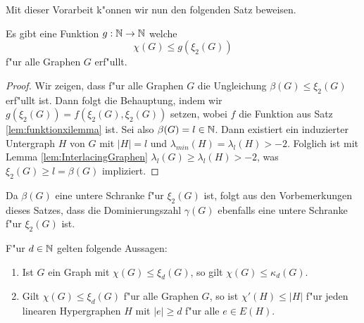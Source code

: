 Mit dieser Vorarbeit k"onnen wir nun den folgenden Satz beweisen.
\begin{corollary}
  Es gibt eine Funktion $g:{\mathbb{N}} \to {\mathbb{N}}$ welche $$\chi(G) \leq g(\xi_{2}(G))$$ f"ur alle Graphen $G$ erf"ullt. 
  \label{thm:funktionxi}
\end{corollary}

\begin{proof}
  Wir zeigen, dass f"ur alle Graphen $G$ die Ungleichung $\beta(G) \leq \xi_{2}(G) $ erf"ullt ist. Dann folgt die Behauptung, indem wir $g(\xi_2(G))=f(\xi_2(G),\xi_2(G))$ setzen, wobei $f$ die Funktion aus Satz \ref{lem:funktionxilemma} ist. Sei also $\beta(G) = l \in {\mathbb{N}}$. Dann existiert ein induzierter Untergraph $H$ von $G$ mit $|H| = l$ und $\lambda_{min}(H) = \lambda_{l}(H) > -2$. Folglich ist mit Lemma \ref{lem:InterlacingGraphen} $\lambda_l (G) \geq \lambda_{l}(H) > -2$, was $\xi_2(G) \geq l = \beta(G)$ impliziert.
\end{proof}
Da $\beta(G)$ eine untere Schranke f"ur $\xi_{2}(G)$ ist, folgt aus den Vorbemerkungen dieses Satzes, dass die Dominierungszahl $\gamma(G)$ ebenfalls eine untere Schranke f"ur $\xi_{2}(G)$ ist. 
\begin{theorem}
  \label{thm:MainTheorem}
  F"ur $d\in {\mathbb{N}}$ gelten folgende Aussagen:
  \begin{enumerate}[label=\rm{(\alph*)}]
    \item Ist $G$ ein Graph mit $\chi(G) \leq \xi_{d}(G)$, so gilt $\chi(G) \leq \kappa_{d}(G)$.
    \item Gilt $\chi(G) \leq \xi_{d}(G) $ f"ur alle Graphen $G$, so ist $\chi'(H) \leq |H|$ f"ur jeden linearen Hypergraphen $H$ mit $|e| \geq d$ f"ur alle $e\in E(H)$. 
  \end{enumerate}
\end{theorem}

